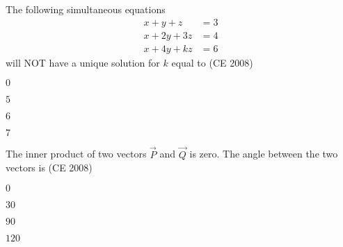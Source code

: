 \item The following simultaneous equations
\begin{align*}
x + y + z &= 3 \\
x + 2y + 3z &= 4 \\
x + 4y + kz &= 6
\end{align*}
will NOT have a unique solution for $k$ equal to \hfill (CE 2008)
\begin{enumerate}
\begin{multicols}{4}
\item $0$
\item $5$
\item $6$
\item $7$
\end{multicols}
\end{enumerate}
\item The inner product of two vectors $\vec{P}$ and $\vec{Q}$ is zero. The angle  between the two vectors is \hfill (CE 2008)
\begin{enumerate}
\begin{multicols}{4}
\item $0$
\item $30$
\item $90$
\item $120$
\end{multicols}
\end{enumerate}

